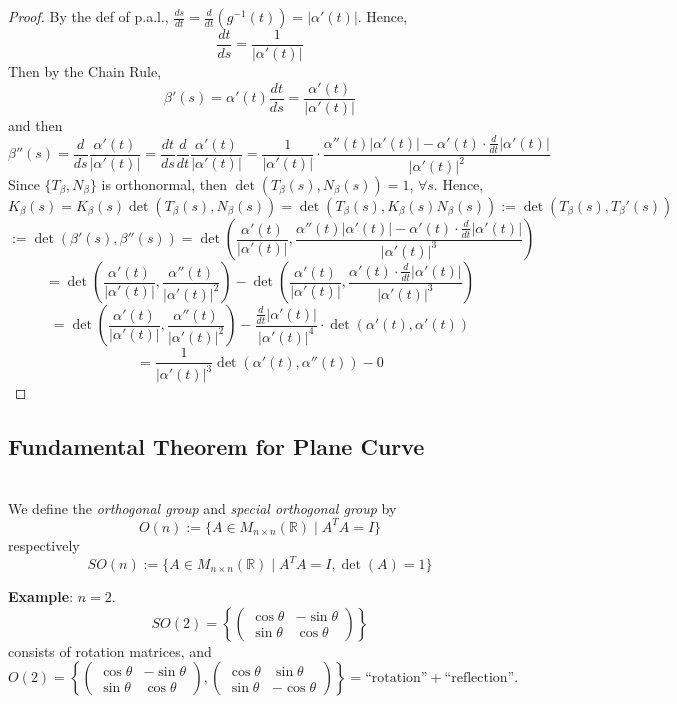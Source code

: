 \begin{proof}
By the def of p.a.l., $\frac{ds}{dt} = \frac{d}{dt}(g^{-1}(t)) = |\alpha'(t)|$. Hence,
\[
\frac{dt}{ds} = \frac{1}{|\alpha'(t)|}
\]
Then by the Chain Rule,
\[
\beta'(s) = \alpha'(t)\frac{dt}{ds} = \frac{\alpha'(t)}{|\alpha'(t)|}
\]
and then
\[
\beta''(s) = \frac{d}{ds}\frac{\alpha'(t)}{|\alpha'(t)|} = \frac{dt}{ds}\frac{d}{dt}\frac{\alpha'(t)}{|\alpha'(t)|} = \frac{1}{|\alpha'(t)|}\cdot\frac{\alpha''(t)|\alpha'(t)| - \alpha'(t)\cdot\frac{d}{dt}|\alpha'(t)|}{|\alpha'(t)|^2}
\]
Since $\{T_\beta, N_\beta\}$ is orthonormal, then $\det(T_\beta(s), N_\beta(s)) = 1$, $\forall s$. Hence,
\[
K_\beta(s) = K_\beta(s)\det(T_\beta(s), N_\beta(s)) = \det(T_\beta(s), K_\beta(s)N_\beta(s)) := \det(T_\beta(s), T_\beta'(s))
\]
\[
:= \det(\beta'(s), \beta''(s)) = \det\left(\frac{\alpha'(t)}{|\alpha'(t)|}, \frac{\alpha''(t)|\alpha'(t)| - \alpha'(t)\cdot\frac{d}{dt}|\alpha'(t)|}{|\alpha'(t)|^3}\right)
\]
\[
= \det\left(\frac{\alpha'(t)}{|\alpha'(t)|}, \frac{\alpha''(t)}{|\alpha'(t)|^2}\right) - \det\left(\frac{\alpha'(t)}{|\alpha'(t)|}, \frac{\alpha'(t)\cdot\frac{d}{dt}|\alpha'(t)|}{|\alpha'(t)|^3}\right)
\]
\[
= \det\left(\frac{\alpha'(t)}{|\alpha'(t)|}, \frac{\alpha''(t)}{|\alpha'(t)|^2}\right) - \frac{\frac{d}{dt}|\alpha'(t)|}{|\alpha'(t)|^4}\cdot\det(\alpha'(t), \alpha'(t))
\]
\[
= \frac{1}{|\alpha'(t)|^3}\det(\alpha'(t), \alpha''(t)) - 0
\]
\end{proof}

\subsection{Fundamental Theorem for Plane Curve}

\\
We define the \textit{orthogonal group} and \textit{special orthogonal group} by
\[
O(n) := \{A\in M_{n\times n}(\mathbb{R}) \mid A^TA = I\}
\]
respectively
\[
SO(n) := \{A\in M_{n\times n}(\mathbb{R}) \mid A^TA = I, \det(A) = 1\}
\]

\noindent\textbf{Example}: $n = 2$.
\[
SO(2) = \left\{\begin{pmatrix}\cos\theta & -\sin\theta\\ \sin\theta & \cos\theta\end{pmatrix}\right\}
\]
consists of {rotation matrices}, and
\[
O(2) = \left\{\begin{pmatrix}\cos\theta & -\sin\theta\\ \sin\theta & \cos\theta\end{pmatrix}, \begin{pmatrix}\cos\theta & \sin\theta\\ \sin\theta & -\cos\theta\end{pmatrix}\right\} = \text{``rotation''} + \text{``reflection''}.
\]

